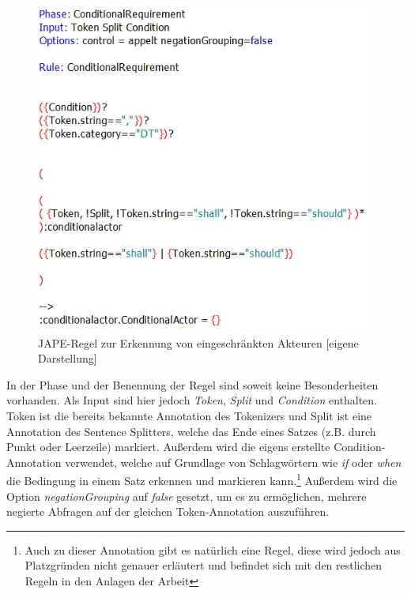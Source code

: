 \documentclass[12pt]{report}
\begin{document}
\begin{figure}[h!]
\begin{center}
\includegraphics[scale=0.8]{Bilder/ConditionalActor.jpg}
\caption{JAPE-Regel zur Erkennung von eingeschränkten Akteuren [eigene Darstellung]}
\end{center}
\end{figure}

In der Phase und der Benennung der Regel sind soweit keine Besonderheiten vorhanden. Als Input sind hier jedoch \textit{Token}, \textit{Split} und \textit{Condition} enthalten. Token ist die bereits bekannte Annotation des Tokenizers und Split ist eine Annotation des Sentence Splitters, welche das Ende eines Satzes (z.B. durch Punkt oder Leerzeile) markiert. Außerdem wird die eigens erstellte Condition-Annotation verwendet, welche auf Grundlage von Schlagwörtern wie \textit{if} oder \textit{when} die Bedingung in einem Satz erkennen und markieren kann.\footnote{Auch zu dieser Annotation gibt es natürlich eine Regel, diese wird jedoch aus Platzgründen nicht genauer erläutert und befindet sich mit den restlichen Regeln in den Anlagen der Arbeit} Außerdem wird die Option \textit{negationGrouping} auf \textit{false} gesetzt, um es zu ermöglichen, mehrere negierte Abfragen auf der gleichen Token-Annotation auszuführen. \\
\end{document}
